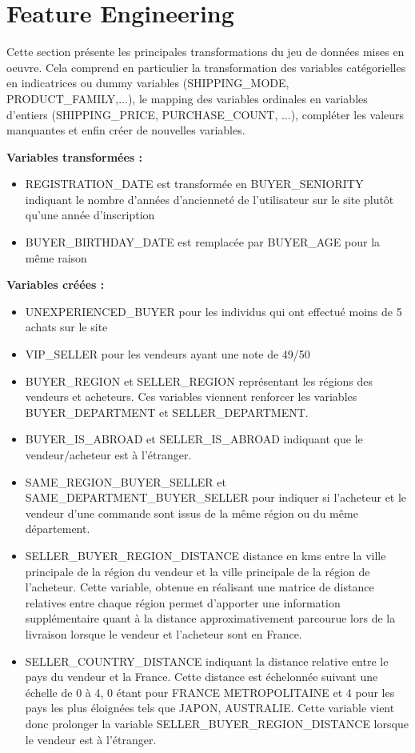 
\chapter{Feature Engineering}

Cette section présente les principales transformations du jeu de données mises en oeuvre.
Cela comprend en particulier la transformation des variables catégorielles en
indicatrices ou dummy variables (SHIPPING_MODE, PRODUCT_FAMILY,...), le mapping des variables 
ordinales en variables d'entiers (SHIPPING_PRICE, PURCHASE_COUNT, ...),
compléter les valeurs manquantes et enfin créer de nouvelles variables.

\textbf{Variables transformées :}

\begin{itemize}
\item REGISTRATION_DATE est transformée en BUYER_SENIORITY indiquant le nombre d'années
d'ancienneté de l'utilisateur sur le site plutôt qu'une année d'inscription
\item BUYER_BIRTHDAY_DATE est remplacée par BUYER_AGE pour la même raison
\end{itemize}

\textbf{Variables créées :}

\begin{itemize}
\item UNEXPERIENCED_BUYER pour les individus qui ont effectué moins de 5 achats sur le site
\item VIP_SELLER pour les vendeurs ayant une note de 49/50
\item BUYER_REGION et SELLER_REGION représentant les régions des vendeurs et acheteurs.
Ces variables viennent renforcer les variables BUYER_DEPARTMENT et SELLER_DEPARTMENT.
\item BUYER_IS_ABROAD et SELLER_IS_ABROAD indiquant que le vendeur/acheteur est à l'étranger.
\item SAME_REGION_BUYER_SELLER et SAME_DEPARTMENT_BUYER_SELLER pour indiquer si l'acheteur
et le vendeur d'une commande sont issus de la même région ou du même département.
\item SELLER_BUYER_REGION_DISTANCE distance en kms entre la ville principale de la région
du vendeur et la ville principale de la région de l'acheteur. Cette variable, obtenue en 
réalisant une matrice de distance relatives entre chaque région permet d'apporter une
information supplémentaire quant à la distance approximativement parcourue lors de la 
livraison lorsque le vendeur et l'acheteur sont en France. 
\item SELLER_COUNTRY_DISTANCE indiquant la distance relative entre le pays du vendeur et la France. 
Cette distance est échelonnée suivant une échelle de 0 à 4, 0 étant pour FRANCE METROPOLITAINE et 4 pour les 
pays les plus éloignées tels que JAPON, AUSTRALIE. Cette variable vient donc prolonger la variable
SELLER_BUYER_REGION_DISTANCE lorsque le vendeur est à l'étranger.
\end{itemize}

